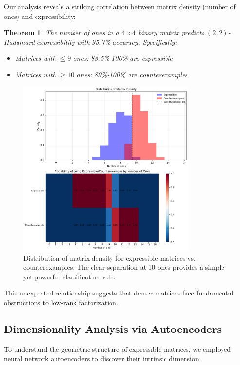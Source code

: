 \documentclass[11pt]{amsart}
\theoremstyle{plain}
\newtheorem{theorem}{Theorem}
\theoremstyle{definition}
\theoremstyle{remark}
\begin{document}
Our analysis reveals a striking correlation between matrix density (number of ones) and expressibility:

\begin{theorem}
The number of ones in a $4 \times 4$ binary matrix predicts $(2,2)$-Hadamard expressibility with 95.7\% accuracy. Specifically:
\begin{itemize}
\item Matrices with $\leq 9$ ones: 88.5\%-100\% are expressible
\item Matrices with $\geq 10$ ones: 89\%-100\% are counterexamples
\end{itemize}
\end{theorem}

\begin{figure}[H]
\centering
\includegraphics[width=0.8\textwidth]{../ones_analysis_detailed.png}
\caption{Distribution of matrix density for expressible matrices vs. counterexamples. The clear separation at 10 ones provides a simple yet powerful classification rule.}
\end{figure}

This unexpected relationship suggests that denser matrices face fundamental obstructions to low-rank factorization.

\subsection{Dimensionality Analysis via Autoencoders}

To understand the geometric structure of expressible matrices, we employed neural network autoencoders to discover their intrinsic dimension.
\end{document}
